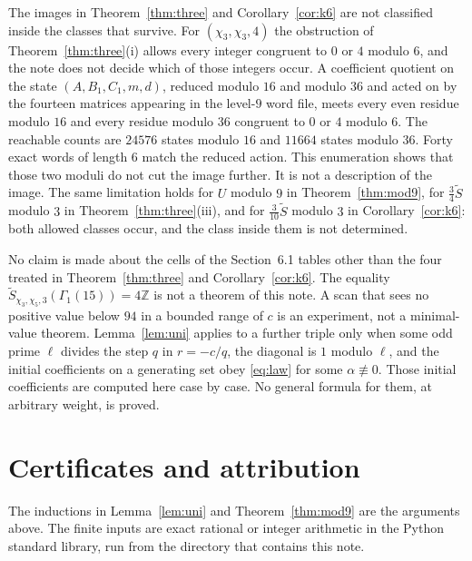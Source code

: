 \documentclass[11pt]{article}
\theoremstyle{remark}
\newcommand{\tS}{\widetilde{S}}
\newcommand{\Z}{\mathbb{Z}}
\begin{document}
The images in Theorem~\ref{thm:three} and Corollary~\ref{cor:k6} are not classified inside the classes that survive.
For \((\chi_3,\chi_3,4)\) the obstruction of Theorem~\ref{thm:three}(i) allows every integer congruent to \(0\) or \(4\) modulo \(6\), and the note does not decide which of those integers occur.
A coefficient quotient on the state \((A,B_1,C_1,m,d)\), reduced modulo \(16\) and modulo \(36\) and acted on by the fourteen matrices appearing in the level-\(9\) word file, meets every even residue modulo \(16\) and every residue modulo \(36\) congruent to \(0\) or \(4\) modulo \(6\).
The reachable counts are \(24576\) states modulo \(16\) and \(11664\) states modulo \(36\).
Forty exact words of length \(6\) match the reduced action.
This enumeration shows that those two moduli do not cut the image further.
It is not a description of the image.
The same limitation holds for \(U\) modulo \(9\) in Theorem~\ref{thm:mod9}, for \(\tfrac34\tS\) modulo \(3\) in Theorem~\ref{thm:three}(iii), and for \(\tfrac{3}{10}\tS\) modulo \(3\) in Corollary~\ref{cor:k6}: both allowed classes occur, and the class inside them is not determined.

No claim is made about the cells of the Section~6.1 tables other than the four treated in Theorem~\ref{thm:three} and Corollary~\ref{cor:k6}.
The equality \(\tS_{\chi_3,\chi_5,3}(\Gamma_1(15))=4\Z\) is not a theorem of this note.
A scan that sees no positive value below \(94\) in a bounded range of \(c\) is an experiment, not a minimal-value theorem.
Lemma~\ref{lem:uni} applies to a further triple only when some odd prime \(\ell\) divides the step \(q\) in \(r=-c/q\), the diagonal is \(1\) modulo \(\ell\), and the initial coefficients on a generating set obey \eqref{eq:law} for some \(\alpha\not\equiv 0\).
Those initial coefficients are computed here case by case.
No general formula for them, at arbitrary weight, is proved.

\section{Certificates and attribution}
\label{sec:attr}

The inductions in Lemma~\ref{lem:uni} and Theorem~\ref{thm:mod9} are the arguments above.
The finite inputs are exact rational or integer arithmetic in the Python standard library, run from the directory that contains this note.
\end{document}
